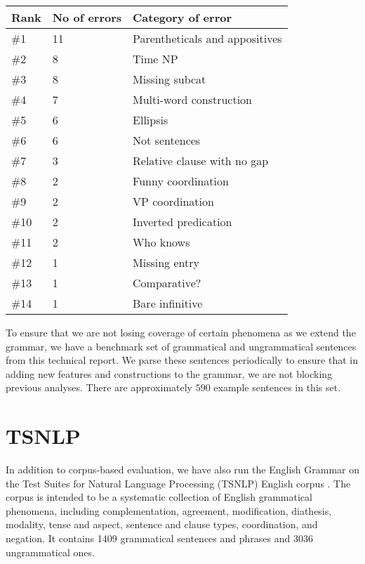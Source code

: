 \begin{table}[htb] 
\centering 
\begin{tabular}{|l|l|l|} \hline 
Rank & No of errors & Category of error \\ \hline 
\#1  & 11  &    Parentheticals and appositives \\ \hline 
\#2  & 8     &  Time NP \\ \hline 
\#3  & 8  &     Missing subcat \\ \hline 
\#4  & 7 &      Multi-word construction \\ \hline 
\#5  & 6 &       Ellipsis \\ \hline 
\#6  & 6  &      Not sentences \\ \hline 
\#7  & 3  &      Relative clause with no gap \\ \hline 
\#8  & 2  &      Funny coordination \\ \hline 
\#9  & 2  &      VP coordination \\ \hline 
\#10  & 2  &      Inverted predication \\ \hline 
\#11  & 2  &      Who knows \\ \hline 
\#12  & 1  &      Missing entry \\ \hline 
\#13  & 1   &     Comparative? \\ \hline 
\#14  & 1    &    Bare infinitive \\ \hline 
\end{tabular} 
\begin{rawhtml} <dl> <dt>{Results of Corpus Based Error Analysis <p> </dl> \end{rawhtml}
\label{errors} 
\end{table} 
 
To ensure that we are not losing coverage of certain phenomena as we 
extend the grammar, we have a benchmark set of grammatical and 
ungrammatical sentences from this technical report. We parse these 
sentences periodically to ensure that in adding new features and 
constructions to the grammar, we are not blocking previous analyses. 
There are approximately $590$ example sentences in this set. 
 
\section{TSNLP} 
 
In addition to corpus-based evaluation, we have also run the English 
Grammar on the Test Suites for Natural Language Processing (TSNLP) 
English corpus \cite{Lehmann96}. The corpus is intended to be a 
systematic collection of English grammatical phenomena, including 
complementation, agreement, modification, diathesis, modality, tense 
and aspect, sentence and clause types, coordination, and negation. It 
contains 1409 grammatical sentences and phrases and 3036 ungrammatical 
ones. 
 
